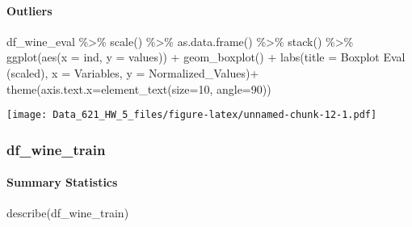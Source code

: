 \documentclass[
]{article}
\newenvironment{Shaded}{\begin{snugshade}}{\end{snugshade}}
\newcommand{\AttributeTok}[1]{\textcolor[rgb]{0.77,0.63,0.00}{#1}}
\newcommand{\DecValTok}[1]{\textcolor[rgb]{0.00,0.00,0.81}{#1}}
\newcommand{\FunctionTok}[1]{\textcolor[rgb]{0.00,0.00,0.00}{#1}}
\newcommand{\NormalTok}[1]{#1}
\newcommand{\SpecialCharTok}[1]{\textcolor[rgb]{0.00,0.00,0.00}{#1}}
\newcommand{\StringTok}[1]{\textcolor[rgb]{0.31,0.60,0.02}{#1}}
\begin{document}
\hypertarget{outliers}{%
\paragraph{Outliers}\label{outliers}}

\begin{Shaded}
\begin{Highlighting}[]
\NormalTok{df\_wine\_eval }\SpecialCharTok{\%\textgreater{}\%}
  \FunctionTok{scale}\NormalTok{() }\SpecialCharTok{\%\textgreater{}\%}
  \FunctionTok{as.data.frame}\NormalTok{() }\SpecialCharTok{\%\textgreater{}\%}
  \FunctionTok{stack}\NormalTok{() }\SpecialCharTok{\%\textgreater{}\%}
  \FunctionTok{ggplot}\NormalTok{(}\FunctionTok{aes}\NormalTok{(}\AttributeTok{x =}\NormalTok{ ind, }\AttributeTok{y =}\NormalTok{ values)) }\SpecialCharTok{+}
  \FunctionTok{geom\_boxplot}\NormalTok{() }\SpecialCharTok{+}
  \FunctionTok{labs}\NormalTok{(}\AttributeTok{title =} \StringTok{\textquotesingle{}Boxplot Eval (scaled)\textquotesingle{}}\NormalTok{,}
       \AttributeTok{x =} \StringTok{\textquotesingle{}Variables\textquotesingle{}}\NormalTok{,}
       \AttributeTok{y =} \StringTok{\textquotesingle{}Normalized\_Values\textquotesingle{}}\NormalTok{)}\SpecialCharTok{+}
  \FunctionTok{theme}\NormalTok{(}\AttributeTok{axis.text.x=}\FunctionTok{element\_text}\NormalTok{(}\AttributeTok{size=}\DecValTok{10}\NormalTok{, }\AttributeTok{angle=}\DecValTok{90}\NormalTok{)) }
\end{Highlighting}
\end{Shaded}

\texttt{[image: Data\_621\_HW\_5\_files/figure-latex/unnamed-chunk-12-1.pdf]}

\hypertarget{df_wine_train}{%
\subsubsection{df\_wine\_train}\label{df_wine_train}}

\hypertarget{summary-statistics-1}{%
\paragraph{Summary Statistics}\label{summary-statistics-1}}

\begin{Shaded}
\begin{Highlighting}[]
\FunctionTok{describe}\NormalTok{(df\_wine\_train)}
\end{Highlighting}
\end{Shaded}
\end{document}
